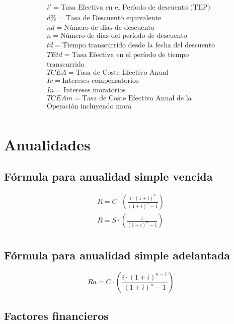 \documentclass[a4paper, twocolumn]{article}
\begin{document}
\begin{gather*}
    i' = \text{Tasa Efectiva en el Período de descuento (TEP)} \\
    d\% = \text{Tasa de Descuento equivalente} \\
    nd = \text{Número de días de descuento} \\
    n = \text{Número de días del período de descuento} \\
    td = \text{Tiempo transcurrido desde la fecha del descuento} \\
    TEtd = \text{Tasa Efectiva en el período de tiempo} \\
    \text{transcurrido} \\
    TCEA = \text{Tasa de Coste Efectivo Anual} \\
    Ic = \text{Intereses compensatorios} \\
    In = \text{Intereses moratorios} \\
    TCEAm = \text{Tasa de Coste Efectivo Anual de la} \\
    \text{Operación incluyendo mora} \\
\end{gather*}

\section{Anualidades}

\subsection{Fórmula para anualidad simple vencida}

\begin{gather*}
    R = C \cdot (\frac{i \cdot (1 + i)^n}{(1 + i)^n - 1}) \\
    R = S \cdot (\frac{i}{(1 + i)^n - 1}) \\
\end{gather*}

\subsection{Fórmula para anualidad simple adelantada}

$$ Ra = C \cdot (\frac{i \cdot (1 + i)^{n - 1}}{(1 + i)^n - 1}) $$

\subsection{Factores financieros}
\end{document}
